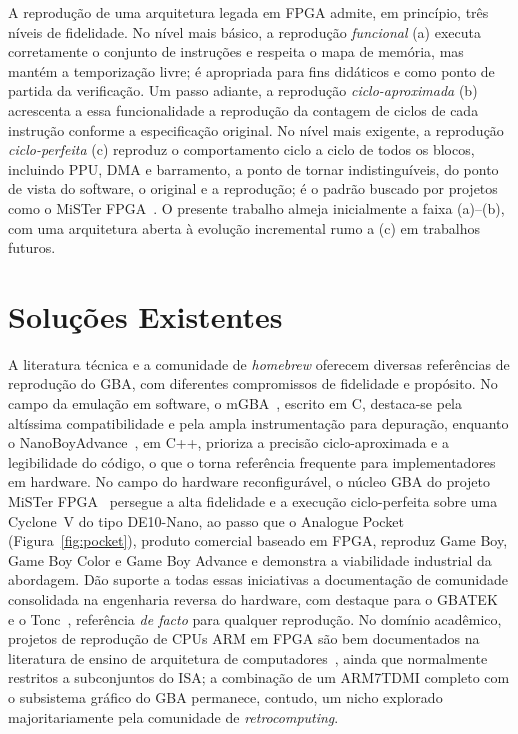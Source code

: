 \documentclass[pnumromarab,times]{politex}
\begin{document}
A reprodução de uma arquitetura legada em FPGA admite, em princípio,
três níveis de fidelidade. No nível mais básico, a reprodução
\emph{funcional} (a) executa corretamente o conjunto de instruções e
respeita o mapa de memória, mas mantém a temporização livre; é
apropriada para fins didáticos e como ponto de partida da
verificação. Um passo adiante, a reprodução \emph{ciclo-aproximada}
(b) acrescenta a essa funcionalidade a reprodução da contagem de
ciclos de cada instrução conforme a especificação original. No nível
mais exigente, a reprodução \emph{ciclo-perfeita} (c) reproduz o
comportamento ciclo a ciclo de todos os blocos, incluindo PPU, DMA
e barramento, a ponto de tornar indistinguíveis, do ponto de
vista do software, o original e a reprodução; é o padrão buscado por
projetos como o MiSTer FPGA~\cite{MiSTer}. O presente trabalho almeja
inicialmente a faixa (a)--(b), com uma arquitetura aberta à evolução
incremental rumo a (c) em trabalhos futuros.


\section{Soluções Existentes}
\label{sec:solucoes}

A literatura técnica e a comunidade de \textit{homebrew} oferecem
diversas referências de reprodução do GBA, com diferentes compromissos
de fidelidade e propósito. No campo da emulação em software, o
mGBA~\cite{mGBA}, escrito em C, destaca-se pela altíssima
compatibilidade e pela ampla instrumentação para depuração, enquanto o
NanoBoyAdvance~\cite{NanoBoyAdvance}, em C++, prioriza a precisão
ciclo-aproximada e a legibilidade do código, o que o torna referência
frequente para implementadores em hardware. No campo do hardware
reconfigurável, o núcleo GBA do projeto MiSTer FPGA~\cite{MiSTer}
persegue a alta fidelidade e a execução ciclo-perfeita sobre uma
Cyclone~V do tipo DE10-Nano, ao passo que o Analogue
Pocket~\cite{AnaloguePocket} (Figura~\ref{fig:pocket}), produto comercial
baseado em FPGA, reproduz Game Boy, Game Boy Color e Game Boy Advance e
demonstra a viabilidade industrial da abordagem. Dão suporte a todas essas
iniciativas a documentação de comunidade consolidada na engenharia
reversa do hardware, com destaque para o GBATEK~\cite{GBATEK} e o
Tonc~\cite{Vijn_Tonc}, referência \textit{de facto} para qualquer
reprodução. No domínio acadêmico, projetos de reprodução de CPUs ARM
em FPGA são bem documentados na literatura de ensino de arquitetura de
computadores~\cite{HarrisHarris,PattersonHennessy}, ainda que
normalmente restritos a subconjuntos do ISA; a combinação de um
ARM7TDMI completo com o subsistema gráfico do GBA permanece, contudo,
um nicho explorado majoritariamente pela comunidade de
\textit{retrocomputing}.
\end{document}
